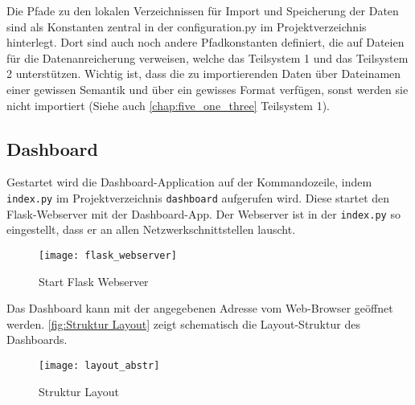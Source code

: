     Die Pfade zu den lokalen Verzeichnissen für Import und Speicherung der Daten sind als Konstanten zentral in der configuration.py 
    im Projektverzeichnis hinterlegt. Dort sind auch noch andere Pfadkonstanten definiert, die auf Dateien für die Datenanreicherung verweisen, welche das Teilsystem 1
    und das Teilsystem 2 unterstützen. Wichtig ist, dass die zu importierenden Daten über Dateinamen einer gewissen Semantik und 
    über ein gewisses Format verfügen, sonst werden sie nicht importiert (Siehe auch \autoref{chap:five_one_three} Teilsystem 1).

    \subsection{Dashboard}
    Gestartet wird die Dashboard-Application auf der Kommandozeile, indem \texttt{index.py} im Projektverzeichnis \texttt{dashboard}
    aufgerufen wird. Diese startet den Flask-Webserver mit der Dashboard-App. Der Webserver ist in der \texttt{index.py} so eingestellt, 
    dass er an allen Netzwerkschnittstellen lauscht.


    \begin{figure}[H]
        \centering
            \texttt{[image: flask\_webserver]}
            \caption{Start Flask Webserver}
            \label{fig:flask}
    \end{figure}

    
    Das Dashboard kann mit der angegebenen Adresse vom Web-Browser geöffnet werden.
    \autoref{fig:Struktur Layout} zeigt schematisch die Layout-Struktur des Dashboards. 


    \begin{figure}[H]
        \centering
            \texttt{[image: layout\_abstr]}
            \caption{Struktur Layout}
            \label{fig:Struktur Layout}
    \end{figure}


